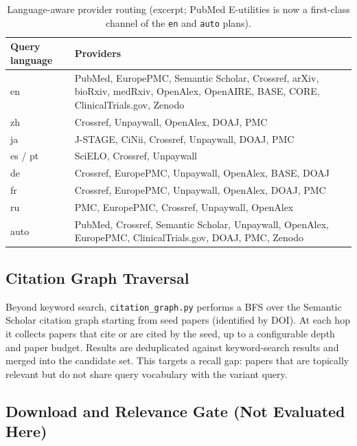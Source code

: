 \documentclass[nonacm,sigconf]{acmart}
\begin{document}
\begin{table}[t]
\centering
\small
\begin{threeparttable}
\caption{Language-aware provider routing (excerpt; PubMed E-utilities is
now a first-class channel of the \texttt{en} and \texttt{auto} plans).}
\label{tab:routing}
\begin{tabular}{@{}p{1.5cm}p{5.3cm}@{}}
\toprule
Query language & Providers \\
\midrule
en & PubMed, EuropePMC, Semantic Scholar, Crossref, arXiv, bioRxiv, medRxiv, OpenAlex, OpenAIRE, BASE, CORE, ClinicalTrials.gov, Zenodo \\
zh & Crossref, Unpaywall, OpenAlex, DOAJ, PMC \\
ja & J-STAGE, CiNii, Crossref, Unpaywall, DOAJ, PMC \\
es / pt & SciELO, Crossref, Unpaywall \\
de & Crossref, EuropePMC, Unpaywall, OpenAlex, BASE, DOAJ \\
fr & Crossref, EuropePMC, Unpaywall, OpenAlex, DOAJ, PMC \\
ru & PMC, EuropePMC, Crossref, Unpaywall, OpenAlex \\
auto & PubMed, Crossref, Semantic Scholar, Unpaywall, OpenAlex, EuropePMC, ClinicalTrials.gov, DOAJ, PMC, Zenodo \\
\bottomrule
\end{tabular}
\end{threeparttable}
\end{table}

\subsection{Citation Graph Traversal}
\label{sec:citation}

Beyond keyword search, \texttt{citation\_graph.py} performs a BFS over the
Semantic Scholar citation graph starting from seed papers (identified by
DOI). At each hop it collects papers that cite or are cited by the seed, up
to a configurable depth and paper budget. Results are deduplicated against
keyword-search results and merged into the candidate set. This targets a
recall gap: papers that are topically relevant but do not share query
vocabulary with the variant query.

\subsection{Download and Relevance Gate (Not Evaluated Here)}
\label{sec:download}
\end{document}
